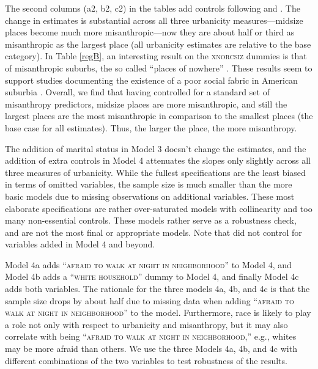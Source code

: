 \documentclass[11pt, letterpaper]{article}
\begin{document}
\begin{spacing}{1.4}
The second columns (a2, b2, c2) in the tables add controls following
\citet{welch07} and \citet{smith97}.
 The change in  estimates is substantial across all three urbanicity
 measures---midsize places become much more misanthropic---now they are about
 half or third as misanthropic as the largest place (all urbanicity estimates
 are relative to the base category). 
 In Table \ref{regB}, an interesting result on the
\textsc{xnorcsiz} dummies is that of misanthropic suburbs, the so called ``places of
nowhere'' \citep{kunstler12}. These results seem to support studies documenting the existence of a poor social fabric in American suburbia \citep{duany01,kunstler12,kay97}.
Overall,
 we find that having controlled for a standard set of misanthropy predictors, midsize places are more misanthropic, and still the
 largest places are the most misanthropic in comparison to the smallest
 places (the base case for all estimates).
Thus, the larger the place, the more misanthropy. 

The addition of marital status in Model 3 doesn't change the estimates, and the addition of extra controls in Model 4 attenuates the slopes only slightly  across
all three measures of urbanicity.
{While the fullest specifications are the least biased in terms of omitted
variables, the sample size is much smaller than the more basic models due to
missing observations on additional variables. These most elaborate
specifications are rather over-saturated models with collinearity and 
too many non-essential controls. These models rather serve as a robustness check, and are not the most final or appropriate models. %
 Note that  \citet{wilson85} did not control for variables added in Model 4 and beyond.}


Model 4a adds ``\textsc{afraid to walk at night in neighborhood}'' to Model 4,
and Model 4b adds a ``\textsc{white household}'' dummy to Model 4, and finally
Model 4c adds both variables.  The rationale for the three models 4a, 4b, and 4c is
that the sample size drops by about half due to missing data when adding ``\textsc{afraid to walk at night in neighborhood}'' to the model. Furthermore, race is
likely to play a role not only with respect to urbanicity and misanthropy, but it
may also correlate with being ``\textsc{afraid to walk at night in neighborhood},'' e.g., whites may be more afraid than others. We use the three
Models 4a, 4b, and 4c with different combinations of the two variables to test robustness of the results. 
%


\end{spacing}
\end{document}
